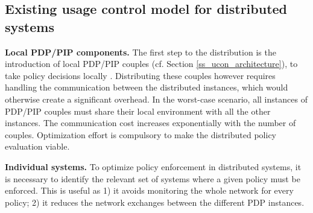 \subsection{Existing usage control model for distributed systems}
\label{ss_distributed_system_model}


\textbf{Local PDP/PIP components.} The first step to the distribution is the introduction of local PDP/PIP couples (cf. Section \ref{ss_ucon_architecture}), to take policy decisions locally \cite{Kelbert2018}. Distributing these couples however requires handling the communication between the distributed instances, which would otherwise create a significant overhead. In the worst-case scenario, all instances of PDP/PIP couples must share their local environment with all the other instances. The communication cost increases exponentially with the number of couples. Optimization effort is compulsory to make the distributed policy evaluation viable. 

\textbf{Individual systems.} To optimize policy enforcement in distributed systems, it is necessary to identify the relevant set of systems where a given policy must be enforced. This is useful as 1) it avoids monitoring the whole network for every policy; 2) it reduces the network exchanges between the different PDP instances. 

